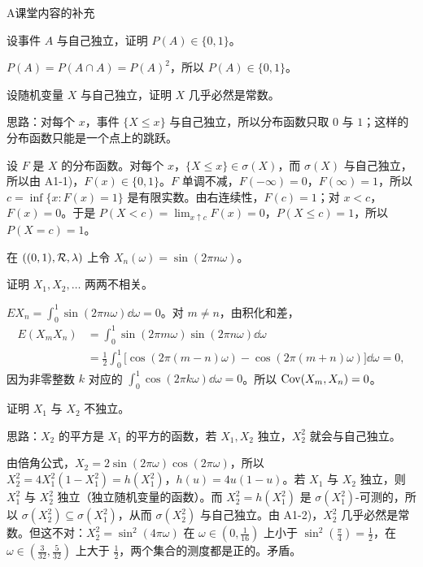 \begin{exercises}{A}{课堂内容的补充}
\item\label{ex:independence:A1} 
\begin{questions}
\item 设事件 $A$ 与自己独立，证明 $P(A)\in\{0,1\}$。
\begin{solution}
$P(A)=P(A\cap A)=P(A)^2$，所以 $P(A)\in\{0,1\}$。
\end{solution}
\item 设随机变量 $X$ 与自己独立，证明 $X$ 几乎必然是常数。
\begin{solution}
思路：对每个 $x$，事件 $\{X\leqslant x\}$ 与自己独立，所以分布函数只取 $0$ 与 $1$；这样的分布函数只能是一个点上的跳跃。

设 $F$ 是 $X$ 的分布函数。对每个 $x$，$\{X\leqslant x\}\in\sigma(X)$，而 $\sigma(X)$ 与自己独立，所以由 A1-1)，$F(x)\in\{0,1\}$。$F$ 单调不减，$F(-\infty)=0$，$F(\infty)=1$，所以 $c=\inf\{x:F(x)=1\}$ 是有限实数。由右连续性，$F(c)=1$；对 $x<c$，$F(x)=0$。于是 $P(X<c)=\lim_{x\uparrow c}F(x)=0$，$P(X\leqslant c)=1$，所以 $P(X=c)=1$。
\end{solution}
\end{questions}

\item\label{ex:independence:A2} 在 $((0,1),\mathcal{R},\lambda)$ 上令 $X_n(\omega)=\sin(2\pi n\omega)$。
\begin{questions}
\item 证明 $X_1,X_2,\dots$ 两两不相关。
\begin{solution}
$EX_n=\int_0^1\sin(2\pi n\omega)\dd\omega=0$。对 $m\neq n$，由积化和差，
\[
\begin{aligned}
E(X_mX_n)&=\int_0^1\sin(2\pi m\omega)\sin(2\pi n\omega)\dd\omega\\
&=\frac12\int_0^1\bigl[\cos(2\pi(m-n)\omega)-\cos(2\pi(m+n)\omega)\bigr]\dd\omega=0,
\end{aligned}
\]
因为非零整数 $k$ 对应的 $\int_0^1\cos(2\pi k\omega)\dd\omega=0$。所以 $\operatorname{Cov}(X_m,X_n)=0$。
\end{solution}
\item 证明 $X_1$ 与 $X_2$ 不独立。
\begin{solution}
思路：$X_2$ 的平方是 $X_1$ 的平方的函数，若 $X_1,X_2$ 独立，$X_2^2$ 就会与自己独立。

由倍角公式，$X_2=2\sin(2\pi\omega)\cos(2\pi\omega)$，所以 $X_2^2=4X_1^2(1-X_1^2)=h(X_1^2)$，$h(u)=4u(1-u)$。若 $X_1$ 与 $X_2$ 独立，则 $X_1^2$ 与 $X_2^2$ 独立（独立随机变量的函数）。而 $X_2^2=h(X_1^2)$ 是 $\sigma(X_1^2)$-可测的，所以 $\sigma(X_2^2)\subseteq\sigma(X_1^2)$，从而 $\sigma(X_2^2)$ 与自己独立。由 A1-2)，$X_2^2$ 几乎必然是常数。但这不对：$X_2^2=\sin^2(4\pi\omega)$ 在 $\omega\in(0,\frac1{16})$ 上小于 $\sin^2(\frac\pi4)=\frac12$，在 $\omega\in(\frac3{32},\frac5{32})$ 上大于 $\frac12$，两个集合的测度都是正的。矛盾。
\end{solution}
\end{questions}


\end{exercises}
